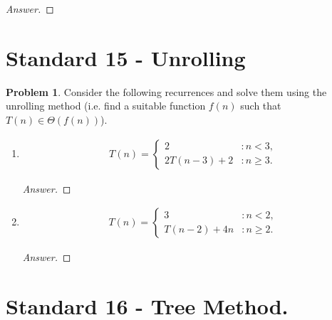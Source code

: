 \documentclass[11pt]{article}
\theoremstyle{definition}
\theoremstyle{definition}
\newtheorem{required}{Problem}
\theoremstyle{definition}
\begin{document}
\begin{proof}[Answer]
\end{proof}

\newpage

\section{Standard 15 - Unrolling}

\begin{required} \label{Unrolling1}
Consider the following recurrences and solve them using the unrolling method (i.e. find a suitable function $f(n)$ such that $T(n) \in \Theta(f(n))$). 
\begin{enumerate} [label=(\alph*)]
    \item 
\begin{align*}
T(n) = \begin{cases}
2 & : n < 3, \\
2T(n - 3) + 2 & : n \geq 3.
\end{cases}
\end{align*}

\begin{proof}[Answer]
\end{proof}

\newpage
\item
\begin{align*}
T(n) = \begin{cases}
3 & : n < 2, \\
T(n-2) + 4n & : n \geq 2.
\end{cases}
\end{align*}

\begin{proof}[Answer]
\end{proof}
\end{enumerate}

\end{required}

\newpage
\section{Standard 16 - Tree Method.}
\end{document}
